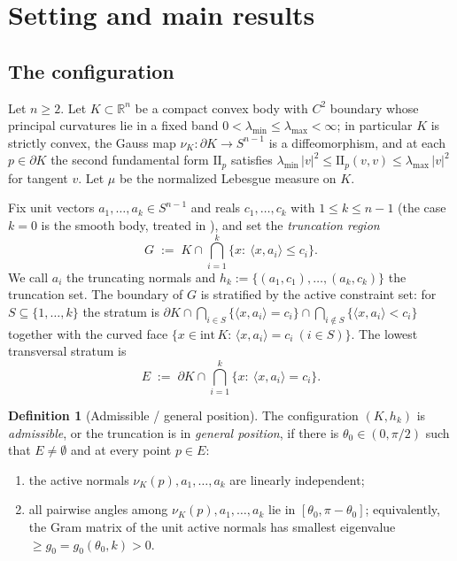 \documentclass[11pt]{article}
\theoremstyle{definition}
\newtheorem{definition}[theorem]{Definition}
\theoremstyle{remark}
\newcommand{\R}{\mathbb{R}}
\newcommand{\nor}{\nu_K}
\begin{document}
\section{Setting and main results}\label{sec:intro}

\subsection{The configuration}

Let $n\ge2$.  Let $K\subset\R^n$ be a compact convex body with $C^2$
boundary whose principal curvatures lie in a fixed band
$0<\lambda_{\min}\le\lambda_{\max}<\infty$; in particular $K$ is strictly
convex, the Gauss map $\nor:\partial K\to S^{n-1}$ is a diffeomorphism, and at
each $p\in\partial K$ the second fundamental form $\mathrm{I\!I}_p$ satisfies
$\lambda_{\min}\,|v|^2\le\mathrm{I\!I}_p(v,v)\le\lambda_{\max}\,|v|^2$ for
tangent $v$.  Let $\mu$ be the normalized Lebesgue measure on $K$.

Fix unit vectors $a_1,\dots,a_k\in S^{n-1}$ and reals $c_1,\dots,c_k$ with
$1\le k\le n-1$ (the case $k=0$ is the smooth body, treated in
\cite{companion3}), and set the \emph{truncation region}
\[
G\;:=\;K\cap\bigcap_{i=1}^{k}\{x:\ \langle x,a_i\rangle\le c_i\}.
\]
We call $a_i$ the truncating normals and $h_k:=\{(a_1,c_1),\dots,(a_k,c_k)\}$
the truncation set.  The boundary of $G$ is stratified by the active
constraint set: for $S\subseteq\{1,\dots,k\}$ the stratum is
$\partial K\cap\bigcap_{i\in S}\{\langle x,a_i\rangle=c_i\}
\cap\bigcap_{i\notin S}\{\langle x,a_i\rangle<c_i\}$ together with the curved
face $\{x\in\mathrm{int}\,K:\,\langle x,a_i\rangle=c_i\ (i\in S)\}$.  The
lowest transversal stratum is
\[
E\;:=\;\partial K\cap\bigcap_{i=1}^{k}\{x:\ \langle x,a_i\rangle=c_i\}.
\]

\begin{definition}[Admissible / general position]\label{def:adm}
The configuration $(K,h_k)$ is \emph{admissible}, or the truncation is in
\emph{general position}, if there is $\theta_0\in(0,\pi/2)$ such that
$E\ne\emptyset$ and at every point $p\in E$:
\begin{enumerate}
\item[(GP1)] the active normals $\nor(p),a_1,\dots,a_k$ are linearly
independent;
\item[(GP2)] all pairwise angles among $\nor(p),a_1,\dots,a_k$ lie in
$[\theta_0,\pi-\theta_0]$; equivalently, the Gram matrix of the unit active
normals has smallest eigenvalue $\ge g_0=g_0(\theta_0,k)>0$.
\end{enumerate}
\end{definition}
\end{document}
